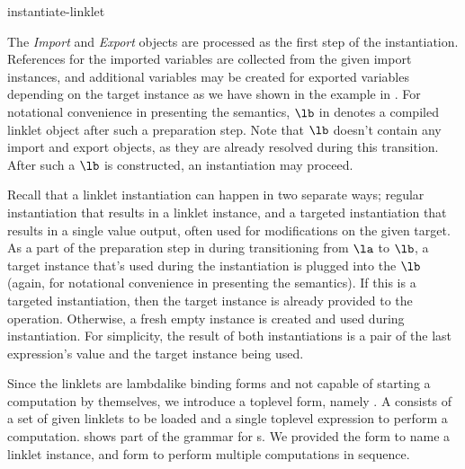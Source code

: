 		\begin{paragraph-here}%
			instantiate-linklet

			The \emph{Import} and \emph{Export}
			objects are processed as the first step of the instantiation. References for the imported variables are collected from
			the given import instances, and additional variables may be created
			for exported variables depending on the target instance as we have
			shown in the example in . For notational convenience in presenting the semantics, $\lb$ in 
			denotes a compiled linklet object after such a preparation step. Note that $\lb$ doesn't contain any import and export objects, as they are already resolved during this transition. After such a $\lb$ is constructed, an instantiation may proceed.
		\end{paragraph-here}

		\begin{paragraph-here}%
			Recall that a linklet instantiation can happen in two separate ways; regular instantiation that results in a linklet instance, and a targeted instantiation that results in a single value output, often used for modifications on the given target. As a part of the preparation step in  during transitioning from $\la$ to $\lb$, a target instance that's used during the instantiation is plugged into the $\lb$ (again, for notational convenience in presenting the semantics). If this is a targeted instantiation, then the target instance is already provided to the  operation. Otherwise, a fresh empty instance is created and used during instantiation. For simplicity, the result of both instantiations is a pair of the last expression’s value and the target instance being used.
		\end{paragraph-here}


		\begin{paragraph-here}
			Since the linklets are lambda\dash like binding forms and not capable
			of starting a computation by themselves, we introduce a top\dash level
			form, namely . A  consists of
			a set of given linklets to be loaded and a single top\dash level
			expression to perform a computation. \figref{fig:linklet-program}
			shows part of the grammar for s. We provided
			the  form to name a linklet instance,
			and  form to perform multiple computations in
			sequence.
		\end{paragraph-here}

